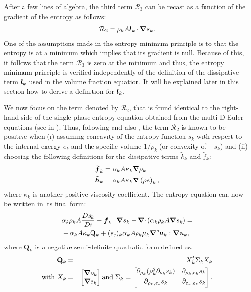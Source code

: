 After a few lines of algebra, the third term ${\mathcal{R}_3}$ can be recast as a function of the gradient of the entropy as follows:
\begin{align}
 \label{eq:ent-R3-sct4}
  \mathcal{R}_2  =  \rho_k A \boldsymbol l_k \cdot \boldsymbol{\nabla} s_k.
\end{align} 
One of the assumptions made in the entropy minimum principle is to that the entropy 
is at a minimum which implies that its gradient is null. Because of this, it follows that
the term $\mathcal{R}_3$ is zero at the minimum and thus, the entropy minimum principle is verified
independently of the definition of the dissipative term $\boldsymbol l_k$ used in the volume fraction
equation. It will be explained later in this section how to derive a definition for $\boldsymbol l_k$.

We now focus on the term denoted by $\mathcal{R}_2$, that is found identical to the right-hand-side of the single phase entropy equation obtained from the multi-D Euler equations (see  in ). Thus, following \cite{jlg} and also , the term $\mathcal{R}_2$ is known to be positive when (i) assuming concavity of the entropy function $s_k$ with respect to the internal energy $e_k$ and the specific volume $1 / \rho_k$ (or convexity of $-s_k$) and (ii) choosing the following definitions for the dissipative terms $\tilde{h}_k$ and $\tilde{f}_k$:
%
\begin{align}
&\tilde{\boldsymbol f}_k = \alpha_k A \kappa_k \boldsymbol{\nabla} \rho_k \\
&\tilde{\boldsymbol h}_k = \alpha_k A \kappa_k \boldsymbol{\nabla} \left( \rho e \right)_k,
\end{align}
%  
where $\kappa_k$ is another positive viscosity coefficient. The entropy equation can now be written in its final form:
%
\begin{align}\label{eq:ent-res-7-eqn-diss-terms3}
&\alpha_k \rho_k A \frac{Ds_k}{Dt} - \boldsymbol f_k \cdot \boldsymbol{\nabla} s_k - \boldsymbol{\nabla}\! \cdot \! \left( \alpha_k \rho_k A \boldsymbol{\nabla} s_k \right) = \nonumber\\
&- \alpha_k A \kappa_k \mathbf{Q}_k + (s_e)_k \alpha_k A \rho_k \mu_k \boldsymbol{\nabla}^s \boldsymbol u_k : \boldsymbol{\nabla} \boldsymbol u_k,
\end{align}
%
where $\mathbf{Q}_k$ is a negative semi-definite quadratic form defined as:
%
\begin{eqnarray}
\mathbf{Q}_k &=& X^t_k \Sigma_k X_k \nonumber \\
\text{with } X_k &=& \begin{bmatrix}
\boldsymbol{\nabla} \rho_k \\
\boldsymbol{\nabla} e_k 
\end{bmatrix}
\text{and } \Sigma_k = \begin{bmatrix}
       \partial_{\rho_k} (\rho^2_k \partial_{\rho_k} s_k) & \partial_{\rho_k,e_k} s_k  \\[0.3em]
       \partial_{\rho_k,e_k} s_k & \partial_{e_k,e_k} s_k           \\[0.3em]
     \end{bmatrix}. \nonumber 
\end{eqnarray}
